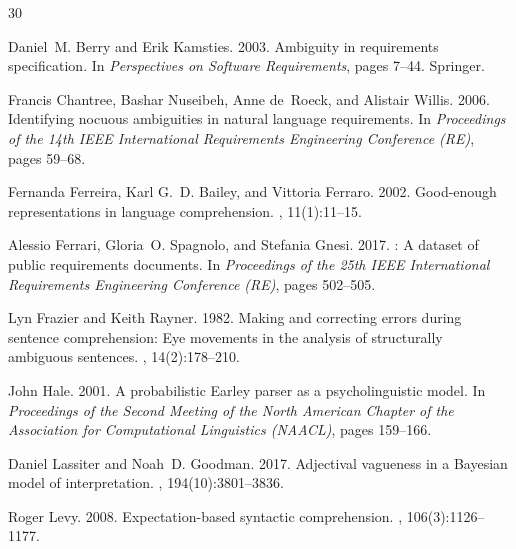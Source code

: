 \documentclass[11pt,a4paper]{article}
\begin{document}
\begin{thebibliography}{30}

Daniel~M. Berry and Erik Kamsties. 2003.
\newblock Ambiguity in requirements specification.
\newblock In {\em Perspectives on Software Requirements}, pages 7--44. Springer.

Francis Chantree, Bashar Nuseibeh, Anne de~Roeck, and Alistair Willis. 2006.
\newblock Identifying nocuous ambiguities in natural language requirements.
\newblock In {\em Proceedings of the 14th IEEE International Requirements Engineering Conference (RE)}, pages 59--68.

Fernanda Ferreira, Karl G.~D. Bailey, and Vittoria Ferraro. 2002.
\newblock Good-enough representations in language comprehension.
, 11(1):11--15.

Alessio Ferrari, Gloria~O. Spagnolo, and Stefania Gnesi. 2017.
: A dataset of public requirements documents.
\newblock In {\em Proceedings of the 25th IEEE International Requirements Engineering Conference (RE)}, pages 502--505.

Lyn Frazier and Keith Rayner. 1982.
\newblock Making and correcting errors during sentence comprehension: Eye movements in the analysis of structurally ambiguous sentences.
, 14(2):178--210.

John Hale. 2001.
\newblock A probabilistic {E}arley parser as a psycholinguistic model.
\newblock In {\em Proceedings of the Second Meeting of the North American Chapter of the Association for Computational Linguistics (NAACL)}, pages 159--166.

Daniel Lassiter and Noah~D. Goodman. 2017.
\newblock Adjectival vagueness in a {B}ayesian model of interpretation.
, 194(10):3801--3836.

Roger Levy. 2008.
\newblock Expectation-based syntactic comprehension.
, 106(3):1126--1177.


\end{thebibliography}
\end{document}

